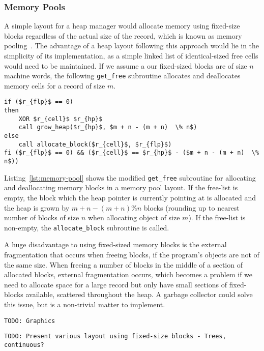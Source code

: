 \subsubsection{Memory Pools}
A simple layout for a heap manager would allocate memory using fixed-size blocks regardless of the actual size of the record, which is known as memory pooling~\cite{bk:memorypool}. The advantage of a heap layout following this approach would lie in the simplicity of its implementation, as a simple linked list of identical-sized free cells would need to be maintained. If we assume a our fixed-sized blocks are of size $n$ machine words, the following \texttt{get\_free} subroutine allocates and deallocates memory cells for a record of size $m$.

\begin{lstlisting}[mathescape=true, caption={Allocating and deallocating records of size $m$ using block of a fixed size $n$. Code modified from~\cite{ha:heap}}, language=janus, style=basic,label={lst:memory-pool}]
if ($r_{flp}$ == 0) 
then
	XOR $r_{cell}$ $r_{hp}$
	call grow_heap($r_{hp}$, $m + n - (m + n)  \% n$)
else
	call allocate_block($r_{cell}$, $r_{flp}$)
fi ($r_{flp}$ == 0) && ($r_{cell}$ == $r_{hp}$ - ($m + n - (m + n)  \% n$))
\end{lstlisting}

Listing~\ref{lst:memory-pool} shows the modified \texttt{get\_free} subroutine for allocating and deallocating memory blocks in a memory pool layout. If the free-list is empty, the block which the heap pointer is currently pointing at is allocated and the heap is grown by $m + n - (m + n)  \% n$ blocks (rounding up to nearest number of blocks of size $n$ when allocating object of size $m$). If the free-list is non-empty, the \texttt{allocate\_block} subroutine is called.  

A huge disadvantage to using fixed-sized memory blocks is the external fragmentation that occurs when freeing blocks, if the program's objects are not of the same size. When freeing a number of blocks in the middle of a section of allocated blocks, external fragmentation occurs, which becomes a problem if we need to allocate space for a large record but only have small sections of fixed-blocks available, scattered throughout the heap. A garbage collector could solve this issue, but is a non-trivial matter to implement.

\texttt{TODO: Graphics}

\texttt{TODO: Present various layout using fixed-size blocks - Trees, continuous?}

